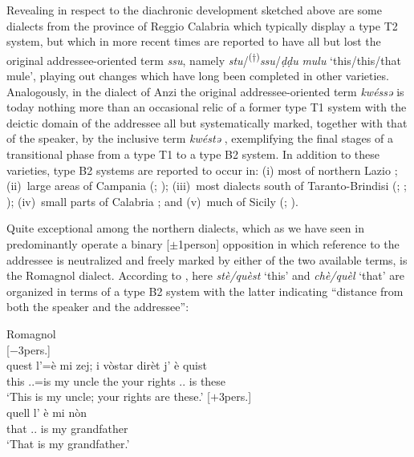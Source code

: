 \documentclass[output=paper]{langsci/langscibook}
\begin{document}
Revealing in respect to the diachronic development sketched above are some
dialects from the province of Reggio Calabria which typically display a type T2
system, but which in more recent times are reported
\citep[129]{Loporcaro:2009a} to have all but lost the original
addressee-oriented term \emph{ssu}, namely
\emph{stu}/\textsuperscript{(†)}\emph{ssu}/\emph{ḍḍu} \emph{mulu}
‘this/this/that mule’, playing out changes which have long been completed in
other varieties. Analogously, in the dialect of Anzi the original
addressee-oriented term \emph{kwéssə} is today nothing more than an occasional
relic of a former type T1 system with the deictic domain of the addressee all
but systematically marked, together with that of the speaker, by the inclusive
term \emph{kwéstə} \citep[50]{Ruggieri:1992a}, exemplifying the final stages of
a transitional phase from a type T1 to a type B2 system. In addition to
these varieties, type B2 systems are reported to occur in: (i) most of
northern Lazio \citep[140]{Stavinschi:2009a}; (ii)~large areas of Campania
(\citealt[74]{Parascandola:1976a}; \citealt[79, 81f]{Castagna:1982a}); (iii)~most
dialects south of Taranto-Brindisi (\citealt[16, 36]{Mancarella:1975a};
\citealt[159]{Mancarella:1998a}; \citealt[129f]{Loporcaro:2009a}); (iv)~small
parts of Calabria \citep[33]{Tassone:2000a}; and (v)~much of Sicily
(\citealt[722]{Varvaro:1988a}; \citealt[92]{ledgeway2004sviluppo}).

Quite exceptional among the northern  dialects, which as we have seen in
 predominantly operate a binary
[$\pm$1person] opposition in which reference to the addressee is neutralized and
freely marked by either of the two available terms, is the Romagnol dialect.
According to \citet[64f]{Masotti:1999a}, here \emph{stè/quèst} ‘this’ and
\emph{chè/quèl} ‘that’ are organized in terms of a type B2 system with
the latter indicating \enquote{distance from both the speaker and the
addressee}:

\ea Romagnol \citep{Masotti:1999a}\\
    \ea {}[$-$3pers.]\\
    \gll    quest  l’=è  mi  zej;  i  vòstar  dirèt  j’  è  quist \\
            this \Sbj.\Cl.\Tsg{}=is  my  uncle  the  your  rights  \Sbj.\Cl.\Tpl{} is  these\\
    \glt    \enquote*{This is my uncle; your rights are these.}
    \ex {}[$+$3pers.]\\
    \gll    quell  l’ è  mi  nòn\\
            that  \Sbj.\Cl.\Tsg{}  is  my  grandfather\\
    \glt    \enquote*{That is my grandfather.}
    \z
\z
\end{document}
